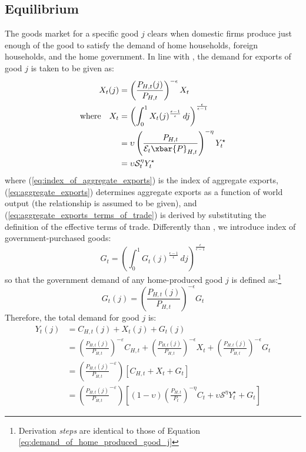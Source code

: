 \subsection{Equilibrium}
The goods market for a specific good $j$ clears when domestic firms produce just enough of the good to satisfy the demand of home households, foreign households, and the home government. In line with \textcite{jordigal_2015_monetary}, the demand for exports of good $j$ is taken to be given as:
\begin{align}
 X_t(j) &= \left(\frac{P_{H,t}(j)}{P_{H,t}}\right)^{-\epsilon} X_t\\
 \text{where} \quad X_t &= \left( \int_{0}^{1} X_t(j)^{\frac{\epsilon-1}{\epsilon}} \, dj\right)^{\frac{\epsilon}{\epsilon-1}} \label{eq:index_of_aggregate_exports}\\
 & =\upsilon\left( \frac{P_{H,t}}{\mathcal{E}_t \xbar{P}_{H,t}}\right)^{-\eta}Y^\star_t \label{eq:aggregate_exports}\\
 & = \upsilon \mathcal{S}_t^{\eta}Y^\star_t \label{eq:aggregate_exports_terms_of_trade}
\end{align} 
where (\ref{eq:index_of_aggregate_exports}) is the index of aggregate exports, (\ref{eq:aggregate_exports}) determines aggregate exports as a function of world output (the relationship is assumed to be given), and (\ref{eq:aggregate_exports_terms_of_trade}) is derived by substituting the definition of the effective terms of trade. Differently than \citereset\textcite{jordigal_2015_monetary}, we introduce index of government-purchased goods:
\begin{equation}
 G_t = \left( \int_{0}^{1} {G_t(j)}^{\frac{\epsilon-1}{\epsilon}} \, dj\right)^{\frac{\epsilon}{\epsilon-1}}
\end{equation}
so that the government demand of any home-produced good $j$ is defined as:\footnote{Derivation \textit{steps} are identical to those of Equation \ref{eq:demand_of_home_produced_good_j}}
\begin{equation}
 G_t(j) = \left( \frac{P_{H,t}(j)}{P_{H,t}} \right)^{-\epsilon} G_t
\end{equation}
Therefore, the total demand for good $j$ is:
\begin{align}
 Y_t(j) &= C_{H,t}(j) + X_t(j) + G_t(j) \label{eq:demand_for_one_good}\\
 &= \left( \frac{P_{H,t}(j)}{P_{H,t}}\right)^{-\varepsilon}C_{H,t} + \left(\frac{P_{H,t}(j)}{P_{H,t}}\right)^{-\epsilon} X_t + \left( \frac{P_{H,t}(j)}{P_{H,t}} \right)^{-\epsilon} G_t \nonumber\\
 &= \left(\frac{P_{H,t}(j)}{P_{H,t}}^{-\varepsilon}\right) \left[ C_{H,t} + X_t + G_t\right] \nonumber\\
 &= \left(\frac{P_{H,t}(j)}{P_{H,t}}^{-\varepsilon}\right) \left[ (1-\upsilon)\left(\frac{P_{H,t}}{P_t}\right)^{-\eta}C_t + \upsilon \mathcal{S}^\eta Y^\star_t + G_t\right]
\end{align}
